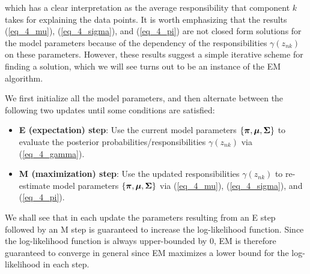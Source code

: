 \documentclass[../main.tex]{subfiles}
\begin{document}
which has a clear interpretation as the average responsibility that component $k$ takes for explaining the data points. It is worth emphasizing that the results (\ref{eq_4_mu}), (\ref{eq_4_sigma}), and (\ref{eq_4_pi}) are not closed form solutions for the model parameters because of the dependency of the responsibilities $\gamma(z_{nk})$ on these parameters. However, these results suggest a simple iterative scheme for finding a solution, which we will see turns out to be an instance of the EM algorithm. 
\par We first initialize all the model parameters, and then alternate between the following two updates until some conditions are satisfied:
\begin{itemize}
	\item  \textbf{E (expectation) step}: Use the current model parameters $\{\bm{\pi}, \bm{\mu}, {\bf \Sigma}\}$ to evaluate the posterior probabilities/responsibilities $\gamma(z_{nk})$ via (\ref{eq_4_gamma}).
	\item  \textbf{M (maximization) step}: Use the updated responsibilities $\gamma(z_{nk})$ to re-estimate model parameters $\{\bm{\pi}, \bm{\mu}, {\bf \Sigma}\}$ via (\ref{eq_4_mu}), (\ref{eq_4_sigma}), and (\ref{eq_4_pi}).
\end{itemize}
We shall see that in each update the parameters resulting from an E step followed by an M step is guaranteed to increase the log-likelihood function. Since the log-likelihood function is always upper-bounded by 0, EM is therefore guaranteed to converge in general since EM maximizes a lower bound for the log-likelihood in each step.
\end{document}
